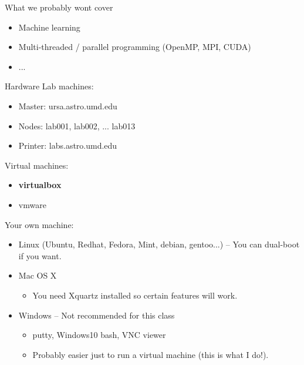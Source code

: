 \documentclass[10pt]{beamer}
\begin{document}
\begin{frame}[fragile]{What we probably wont cover}

	\begin{itemize}
		\item Machine learning
		\item Multi-threaded / parallel programming (OpenMP, MPI, CUDA)
		\item ...
	\end{itemize}

\end{frame}

\begin{frame}[fragile]{Hardware}
	Lab machines:
	\begin{itemize}
		\item Master: ursa.astro.umd.edu
		\item Nodes: lab001, lab002, ... lab013
		\item Printer: labs.astro.umd.edu
	\end{itemize}


	Virtual machines:
	\begin{itemize}
		\item \textbf{virtualbox}
		\item vmware
	\end{itemize}

	Your own machine:
	\begin{itemize}
		\item Linux (Ubuntu, Redhat, Fedora, Mint, debian, gentoo...) -- 	You can dual-boot if you want. 
		\item Mac OS X
		\begin{itemize}
			\item You need Xquartz installed so certain features will work. 
		\end{itemize}
		\item Windows -- Not recommended for this class
		\begin{itemize}
			\item putty, Windows10 bash, VNC viewer
			\item Probably easier just to run a virtual machine (this is what I do!). 
		\end{itemize}
	\end{itemize}

\end{frame}
\end{document}
